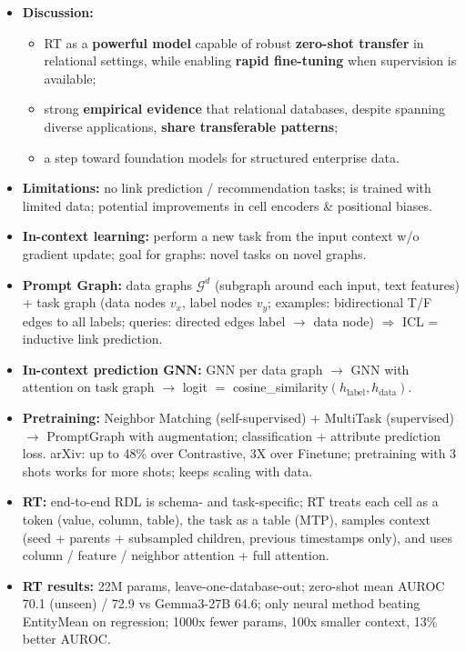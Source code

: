 \begin{itemize}
  \item \textbf{Discussion:}
    \begin{itemize}
      \item RT as a \textbf{powerful model} capable of robust \textbf{zero-shot transfer}
        in relational settings, while enabling \textbf{rapid fine-tuning} when supervision
        is available;
      \item strong \textbf{empirical evidence} that relational databases, despite spanning
        diverse applications, \textbf{share transferable patterns};
      \item a step toward foundation models for structured enterprise data.
    \end{itemize}
  \item \textbf{Limitations:} no link prediction / recommendation tasks; is trained with
    limited data; potential improvements in cell encoders \& positional biases.
\end{itemize}

\bigskip{}
{}
\begin{summarybox}
  \begin{itemize}
    \item \textbf{In-context learning:} perform a new task from the input context w/o
      gradient update; goal for graphs: novel tasks on novel graphs.
    \item \textbf{Prompt Graph:} data graphs $\mathcal{G}^d$ (subgraph around each input,
      text features) + task graph (data nodes $v_x$, label nodes $v_y$; examples:
      bidirectional T/F edges to all labels; queries: directed edges label $\to$ data
      node) $\Rightarrow$ ICL = inductive link prediction.
    \item \textbf{In-context prediction GNN:} GNN per data graph $\to$ GNN with attention on
      task graph $\to$ logit $=$ cosine\_similarity$(h_{\mathrm{label}}, h_{\mathrm{data}})$.
    \item \textbf{Pretraining:} Neighbor Matching (self-supervised) + MultiTask
      (supervised) $\to$ PromptGraph with augmentation; classification + attribute
      prediction loss. arXiv: up to 48\% over Contrastive, 3X over Finetune; pretraining
      with 3 shots works for more shots; keeps scaling with data.
    \item \textbf{RT:} end-to-end RDL is schema- and task-specific; RT treats each cell as
      a token (value, column, table), the task as a table (MTP), samples context (seed +
      parents + subsampled children, previous timestamps only), and uses column /
      feature / neighbor attention + full attention.
    \item \textbf{RT results:} 22M params, leave-one-database-out; zero-shot mean AUROC
      70.1 (unseen) / 72.9 vs Gemma3-27B 64.6; only neural method beating EntityMean on
      regression; 1000x fewer params, 100x smaller context, 13\% better AUROC.
  \end{itemize}
\end{summarybox}
